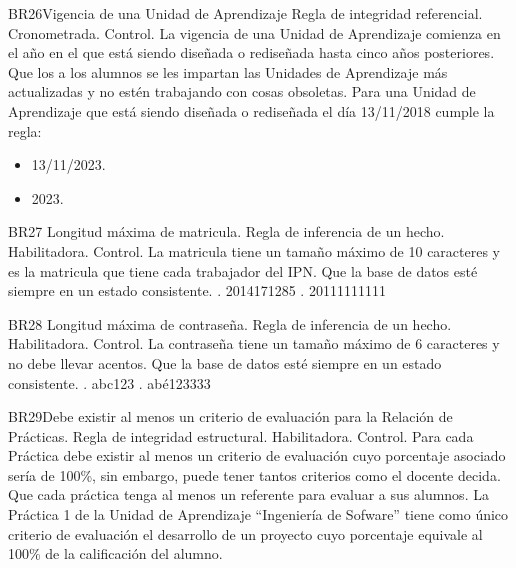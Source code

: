 \begin{BussinesRule}{BR26}{Vigencia de una Unidad de Aprendizaje}
    \BRitem[Tipo:] Regla de integridad referencial.
    \BRitem[Clase:] Cronometrada.
    \BRitem[Nivel:] Control.
    \BRitem[Descripción:] La vigencia de una Unidad de Aprendizaje comienza en el año en el que está siendo diseñada o rediseñada hasta cinco años posteriores.
    \BRitem[Motivación:] Que los a los alumnos se les impartan las Unidades de Aprendizaje más actualizadas y no estén trabajando con cosas obsoletas.
     Para una Unidad de Aprendizaje que está siendo diseñada o rediseñada el día 13/11/2018 cumple la regla:
        \begin{itemize}
            \item 13/11/2023.
            \item 2023.
        \end{itemize}
\end{BussinesRule}
\begin{BussinesRule}{BR27}{ Longitud máxima de matricula.}
    \BRitem[Tipo: ]Regla de inferencia de un hecho.
    \BRitem[Clase: ]Habilitadora.
    \BRitem[Nivel: ]Control.
    \BRitem[Descripción: ]La matricula tiene un tamaño máximo de 10 caracteres y es la matricula que tiene cada trabajador del IPN.
    \BRitem[Sentencia:]
    \BRitem[Motivación: ]Que la base de datos esté siempre en un estado consistente.
     . 2014171285
    . 20111111111
\end{BussinesRule}
\begin{BussinesRule}{BR28}{ Longitud máxima de contraseña.}
    \BRitem[Tipo: ]Regla de inferencia de un hecho.
    \BRitem[Clase: ]Habilitadora.
    \BRitem[Nivel: ]Control.
    \BRitem[Descripción: ]La contraseña tiene un tamaño máximo de 6 caracteres y no debe llevar acentos.
    \BRitem[Sentencia:]
    \BRitem[Motivación: ]Que la base de datos esté siempre en un estado consistente.
     . abc123
    . abé123333
\end{BussinesRule}
\begin{BussinesRule}{BR29}{Debe existir al menos un criterio de evaluación para la Relación de Prácticas.}
    \BRitem[Tipo:] Regla de integridad estructural.
    \BRitem[Clase:] Habilitadora.
    \BRitem[Nivel:] Control.
    \BRitem[Descripción:] Para cada Práctica debe existir al menos un criterio de evaluación cuyo porcentaje asociado sería de 100\%, sin embargo, puede tener tantos criterios como el docente decida.
    \BRitem[Motivación:] Que cada práctica tenga al menos un referente para evaluar a sus alumnos.
     La Práctica 1 de la Unidad de Aprendizaje ``Ingeniería de Sofware'' tiene como único criterio de evaluación el desarrollo de un proyecto cuyo porcentaje equivale al 100\% de la calificación del alumno.
\end{BussinesRule}
